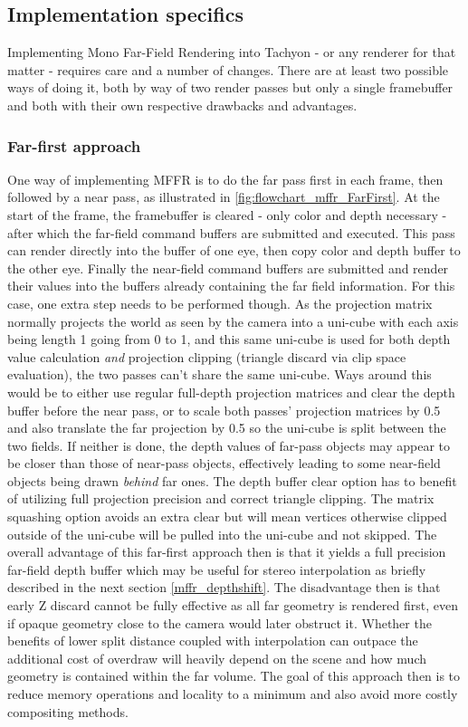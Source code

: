 \subsection{Implementation specifics}
Implementing Mono Far-Field Rendering into Tachyon - or any renderer for that matter - requires care and a number of changes. There are at least two possible ways of doing it, both by way of two render passes but only a single framebuffer and both with their own respective drawbacks and advantages. 
\subsubsection{Far-first approach}
One way of implementing MFFR is to do the far pass first in each frame, then followed by a near pass, as illustrated in \autoref{fig:flowchart_mffr_FarFirst}. At the start of the frame, the framebuffer is cleared - only color and depth necessary - after which the far-field command buffers are submitted and executed. This pass can render directly into the buffer of one eye, then copy color and depth buffer to the other eye. Finally the near-field command buffers are submitted and render their values into the buffers already containing the far field information. 
For this case, one extra step needs to be performed though. As the projection matrix normally projects the world as seen by the camera into a uni-cube with each axis being length 1 going from 0 to 1, and this same uni-cube is used for both depth value calculation \textit{and} projection clipping (triangle discard via clip space evaluation), the two passes can't share the same uni-cube. Ways around this would be to either use regular full-depth projection matrices and clear the depth buffer before the near pass, or to scale both passes' projection matrices by 0.5 and also translate the far projection by 0.5 so the uni-cube is split between the two fields. 
If neither is done, the depth values of far-pass objects may appear to be closer than those of near-pass objects, effectively leading to some near-field objects being drawn \textit{behind} far ones. 
The depth buffer clear option has to benefit of utilizing full projection precision and correct triangle clipping. The matrix squashing option avoids an extra clear but will mean vertices otherwise clipped outside of the uni-cube will be pulled into the uni-cube and not skipped. 
The overall advantage of this far-first approach then is that it yields a full precision far-field depth buffer which may be useful for stereo interpolation as briefly described in the next section \ref{mffr_depthshift}. The disadvantage then is that early Z discard cannot be fully effective as all far geometry is rendered first, even if opaque geometry close to the camera would later obstruct it. Whether the benefits of lower split distance coupled with interpolation can outpace the additional cost of overdraw will heavily depend on the scene and how much geometry is contained within the far volume. 
The goal of this approach then is to reduce memory operations and locality to a minimum and also avoid more costly compositing methods. 
